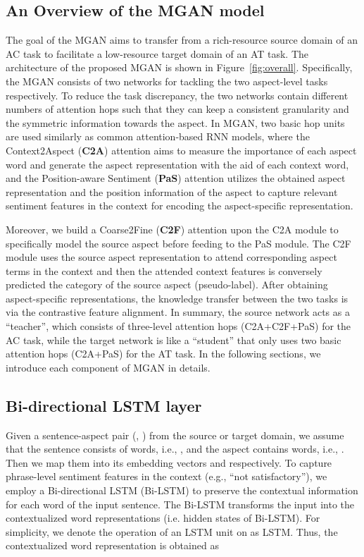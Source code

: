 \documentclass[letterpaper]{article} \usepackage{aaai19}  \usepackage{times}  \usepackage{latexsym}
\begin{document}
\subsection{An Overview of the MGAN model}
The goal of the MGAN aims to transfer from a rich-resource source domain of an AC task to facilitate a low-resource target domain of an AT task. The architecture of the proposed MGAN is shown in Figure~\ref{fig:overall}. Specifically, the MGAN consists of two networks for tackling the two aspect-level tasks respectively. To reduce the task discrepancy, the two networks contain different numbers of attention hops such that they can keep a consistent granularity and the symmetric information towards the aspect. In MGAN, two basic hop units are used similarly as common attention-based RNN models, where the Context2Aspect (\textbf{C2A}) attention aims to measure the importance of each aspect word and generate the aspect representation with the aid of each context word, and the Position-aware Sentiment (\textbf{PaS}) attention utilizes the obtained aspect representation and the position information of the aspect to capture relevant sentiment features in the context for encoding the aspect-specific representation. 

Moreover, we build a Coarse2Fine (\textbf{C2F}) attention upon the C2A module to specifically model the source aspect before feeding to the PaS module. The C2F module uses the source aspect representation to attend corresponding aspect terms in the context and then the attended context features is conversely predicted the category of the source aspect (pseudo-label). After obtaining aspect-specific representations, the knowledge transfer between the two tasks is via the contrastive feature alignment. In summary, the source network acts as a ``teacher'', which consists of three-level attention hops (C2A+C2F+PaS) for the AC task, while the target network is like a ``student'' that only uses two basic attention hops (C2A+PaS) for the AT task. In the following sections, we introduce each component of MGAN in details.




\subsection{Bi-directional LSTM layer}
Given a sentence-aspect pair (, ) from the source or target domain, we assume that the sentence consists of  words, i.e., , and the aspect contains  words, i.e., .
Then we map them into its embedding vectors  and  respectively. To capture phrase-level sentiment features in the context (e.g., ``not satisfactory''), we employ a Bi-directional LSTM (Bi-LSTM) to preserve the contextual information for each word of the input sentence. The Bi-LSTM transforms the input  into the contextualized word representations  (i.e. hidden states of Bi-LSTM). For simplicity, we denote the operation of an LSTM unit on  as LSTM. Thus, the contextualized word representation  is obtained as
\end{document}
